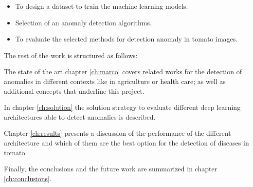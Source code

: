 \begin{itemize}
 \item To design a dataset to train the machine learning models.
 \item Selection of an anomaly detection algorithms.
 \item To evaluate the selected methods for detection anomaly in tomato images.
\end{itemize}

The rest of the work is structured as follows:

The state of the art chapter \ref{ch:marco} covers related works for the detection of anomalies in different contexts like in agriculture or health care; as well as additional concepts that underline this project.

In chapter \ref{ch:solution} the solution strategy to evaluate different deep learning architectures able to detect anomalies is described.

Chapter \ref{ch:results} presents a discussion of the performance of the different architecture and which of them are the best option for the detection of diseases in tomato.

Finally, the conclusions and the future work are summarized in chapter \ref{ch:conclusions}.

